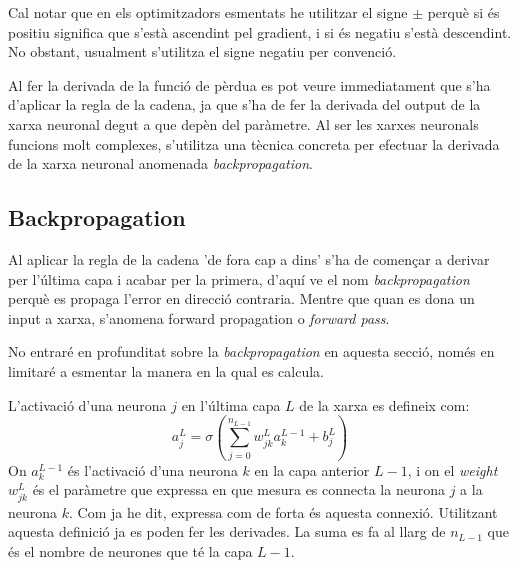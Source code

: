 Cal notar que en els optimitzadors esmentats he utilitzar el signe $\pm$ perquè si és positiu significa que s'està ascendint pel gradient, i si és negatiu s'està descendint. No obstant, usualment s'utilitza el signe negatiu per convenció. 

Al fer la derivada de la funció de pèrdua es pot veure immediatament que s'ha d'aplicar la regla de la cadena, ja que s'ha de fer la derivada del output de la xarxa neuronal degut a que depèn del paràmetre. Al ser les xarxes neuronals funcions molt complexes, s'utilitza una tècnica concreta per efectuar la derivada de la xarxa neuronal anomenada \textit{backpropagation}. 

\subsection{Backpropagation}
Al aplicar la regla de la cadena 'de fora cap a dins' s'ha de començar a derivar per l'última capa i acabar per la primera, d'aquí ve el nom \textit{backpropagation} perquè es propaga l'error en direcció contraria. Mentre que quan es dona un input a xarxa, s'anomena {forward propagation} o \textit{forward pass}.  

No entraré en profunditat sobre la \textit{backpropagation} en aquesta secció, només en limitaré a esmentar la manera en la qual es calcula. 

L'activació d'una neurona $j$ en l'última capa $L$ de la xarxa es defineix com: 
$$
a^{L}_j = \sigma\left(\sum_{j=0}^{n_{L- 1}}w^L_{jk} a^{L-1}_k+ b_j^L\right)
$$
On $a^{L-1}_k$ és l'activació d'una neurona $k$ en la capa anterior $L-1$, i on el \textit{weight} $w^L_{jk}$ és el paràmetre que expressa en que mesura es connecta la neurona $j$ a la neurona $k$. Com ja he dit, expressa com de forta és aquesta connexió. Utilitzant aquesta definició ja es poden fer les derivades. La suma es fa al llarg de $n_{L-1}$ que és el nombre de neurones que té la capa $L-1$.

